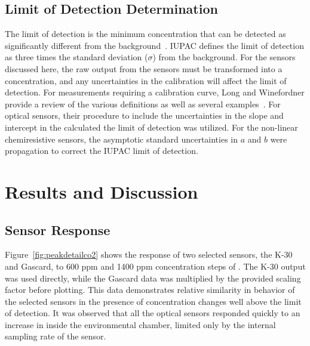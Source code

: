 \documentclass[sensors,article,submit,moreauthors,pdftex]{Definitions/mdpi}
\begin{document}
		\subsection{Limit of Detection Determination}
			\label{sec:method_detection}
			The limit of detection is the minimum concentration that can be detected as significantly different from the background~\cite{long_limit_1983,currie_detection:_1997,mocak_j._statistical_2009}.
			IUPAC defines the limit of detection as three times the standard deviation ($\sigma$) from the background.
			For the sensors discussed here, the raw output from the sensors must be transformed into a concentration, and any uncertainties in the calibration will affect the limit of detection.
			For measurements requiring a calibration curve, Long and Winefordner provide a review of the various definitions as well as several examples~\cite{long_limit_1983}.
			For optical sensors, their procedure to include the uncertainties in the slope and intercept in the calculated the limit of detection was utilized.
			For the non-linear chemiresistive sensors, the asymptotic standard uncertainties in $a$ and $b$ were propagation to correct the IUPAC limit of detection.
			
	
	\section{Results and Discussion}
	
		\subsection{Sensor Response}
		\label{sec:time}
	
			Figure~\ref{fig:peakdetailco2} shows the response of two selected  sensors, the K-30 and Gascard, to 600 ppm and 1400 ppm concentration steps of .
			The K-30 output was used directly, while the Gascard data was multiplied by the provided scaling factor before plotting.
			This data demonstrates relative similarity in behavior of the selected sensors in the presence of concentration changes well above the limit of detection.
			It was observed that all the optical sensors responded quickly to an increase in  inside the environmental chamber, limited only by the internal sampling rate of the sensor.
			
\end{document}
